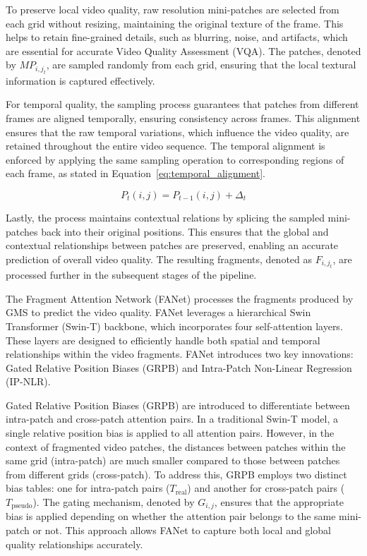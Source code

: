 To preserve local video quality, raw resolution mini-patches are selected from each grid without resizing, maintaining the original texture of the frame. This helps to retain fine-grained details, such as blurring, noise, and artifacts, which are essential for accurate Video Quality Assessment (VQA). The patches, denoted by $MP_{i,j_t}$, are sampled randomly from each grid, ensuring that the local textural information is captured effectively.

For temporal quality, the sampling process guarantees that patches from different frames are aligned temporally, ensuring consistency across frames. This alignment ensures that the raw temporal variations, which influence the video quality, are retained throughout the entire video sequence. The temporal alignment is enforced by applying the same sampling operation to corresponding regions of each frame, as stated in Equation~\ref{eq:temporal_alignment}.

\begin{equation}
P_t(i, j) = P_{t-1}(i, j) + \Delta_t
\label{eq:temporal_alignment}
\end{equation}

Lastly, the process maintains contextual relations by splicing the sampled mini-patches back into their original positions. This ensures that the global and contextual relationships between patches are preserved, enabling an accurate prediction of overall video quality. The resulting fragments, denoted as $F_{i,j_t}$, are processed further in the subsequent stages of the pipeline.

The Fragment Attention Network (FANet) processes the fragments produced by GMS to predict the video quality. FANet leverages a hierarchical Swin Transformer (Swin-T) backbone, which incorporates four self-attention layers. These layers are designed to efficiently handle both spatial and temporal relationships within the video fragments. FANet introduces two key innovations: Gated Relative Position Biases (GRPB) and Intra-Patch Non-Linear Regression (IP-NLR).

Gated Relative Position Biases (GRPB) are introduced to differentiate between intra-patch and cross-patch attention pairs. In a traditional Swin-T model, a single relative position bias is applied to all attention pairs. However, in the context of fragmented video patches, the distances between patches within the same grid (intra-patch) are much smaller compared to those between patches from different grids (cross-patch). To address this, GRPB employs two distinct bias tables: one for intra-patch pairs (\(T_{\text{real}}\)) and another for cross-patch pairs (\(T_{\text{pseudo}}\)). The gating mechanism, denoted by \(G_{i,j}\), ensures that the appropriate bias is applied depending on whether the attention pair belongs to the same mini-patch or not. This approach allows FANet to capture both local and global quality relationships accurately.

